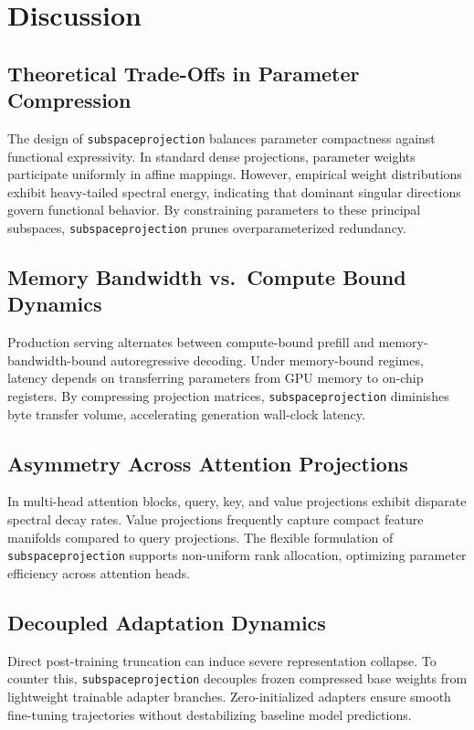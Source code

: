 \section{Discussion}

\subsection{Theoretical Trade-Offs in Parameter Compression}
The design of \texttt{subspaceprojection} balances parameter compactness against functional expressivity. In standard dense projections, parameter weights participate uniformly in affine mappings. However, empirical weight distributions exhibit heavy-tailed spectral energy, indicating that dominant singular directions govern functional behavior. By constraining parameters to these principal subspaces, \texttt{subspaceprojection} prunes overparameterized redundancy.

\subsection{Memory Bandwidth vs.\ Compute Bound Dynamics}
Production serving alternates between compute-bound prefill and memory-bandwidth-bound autoregressive decoding. Under memory-bound regimes, latency depends on transferring parameters from GPU memory to on-chip registers. By compressing projection matrices, \texttt{subspaceprojection} diminishes byte transfer volume, accelerating generation wall-clock latency.

\subsection{Asymmetry Across Attention Projections}
In multi-head attention blocks, query, key, and value projections exhibit disparate spectral decay rates. Value projections frequently capture compact feature manifolds compared to query projections. The flexible formulation of \texttt{subspaceprojection} supports non-uniform rank allocation, optimizing parameter efficiency across attention heads.

\subsection{Decoupled Adaptation Dynamics}
Direct post-training truncation can induce severe representation collapse. To counter this, \texttt{subspaceprojection} decouples frozen compressed base weights from lightweight trainable adapter branches. Zero-initialized adapters ensure smooth fine-tuning trajectories without destabilizing baseline model predictions.

